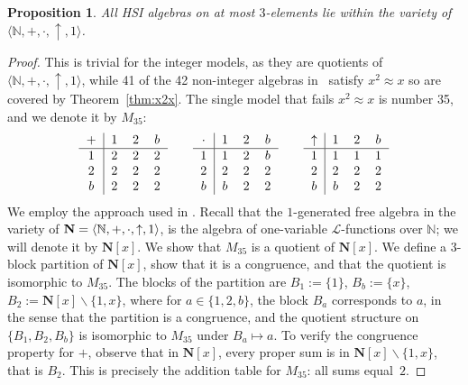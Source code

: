 \documentclass[eqnor,reqno]{amsart}
\theoremstyle{plain}
\newtheorem{pro}[thm]{Proposition}
\theoremstyle{definition}
\begin{document}
\begin{pro}\label{pro:3element}
All HSI algebras on at most $3$-elements lie within the variety of $\langle\mathbb{N},+,\cdot,\uparrow,1\rangle$.
\end{pro}
\begin{proof}
This is trivial for the integer models, as they are quotients of~$\langle\mathbb{N},+,\cdot,\uparrow,1\rangle$, while 41 of the 42 non-integer algebras in~\cite[Appendix~A]{burlee92} satisfy $x^2\approx x$ so are covered by Theorem~\ref{thm:x2x}.  The single model that fails $x^2\approx x$ is number 35, and we denote it by $M_{35}$:
\[
\begin{tabular}{c|ccc}
$+$&$1$&$2$&$b$\\
\hline
$1$&$2$&$2$&$2$\\
$2$&$2$&$2$&$2$\\
$b$&$2$&$2$&$2$\\
\end{tabular}\qquad 
\begin{tabular}{c|ccc}
$\cdot$&$1$&$2$&$b$\\
\hline
$1$&$1$&$2$&$b$\\
$2$&$2$&$2$&$2$\\
$b$&$b$&$2$&$2$\\
\end{tabular}\qquad 
\begin{tabular}{c|ccc}
$\uparrow$&$1$&$2$&$b$\\
\hline
$1$&$1$&$1$&$1$\\
$2$&$2$&$2$&$2$\\
$b$&$b$&$2$&$2$\\
\end{tabular} 
\]
We employ the approach used in \cite[Proposition~3.3]{alsjac2}.
Recall that the $1$-generated free algebra in the variety of ${\bf N}=\langle\mathbb{N},+,\cdot,\uparrow,1\rangle$, is the algebra of one-variable $\mathscr{L}$-functions over $\mathbb{N}$; we will denote it by $\mathbf{N}[x]$.  
We show that $M_{35}$ is a quotient of $\mathbf{N}[x]$.
 We define a 3-block partition of $\mathbf{N}[x]$, show that it is a congruence, and that the quotient is isomorphic to $M_{35}$. 
 The blocks of the partition are $B_1:=\{1\}$, $B_b:=\{ x\}$, $B_2:=\mathbf{N}[x]\backslash\{1,x\}$, where for $a\in \{1,2,b\}$, the  block $B_a$ corresponds to $a$, in the sense that the partition is a congruence, and the quotient structure on $\{B_1,B_2,B_b\}$ is isomorphic to $M_{35}$ under $B_a\mapsto a$.  
 To verify the congruence property for $+$, observe that in $\mathbf{N}[x]$, every proper sum is in $\mathbf{N}[x]\backslash\{1,x\}$, that is $B_2$.  This is precisely the addition table for $M_{35}$: all sums equal~$2$. 

\end{proof}
\end{document}
